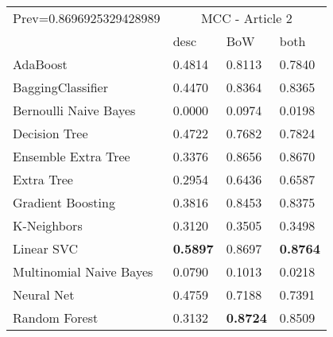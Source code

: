\begin{tabular}{|l|l|l|l| }
\hline
Prev=0.8696925329428989 &  \multicolumn{3}{c|}{MCC - Article 2} \\
\cline{2-4} & desc & BoW & both \\ \hline
AdaBoost                & 0.4814 & 0.8113 & 0.7840\\
BaggingClassifier       & 0.4470 & 0.8364 & 0.8365\\
Bernoulli Naive Bayes   & 0.0000 & 0.0974 & 0.0198\\
Decision Tree           & 0.4722 & 0.7682 & 0.7824\\
Ensemble Extra Tree     & 0.3376 & 0.8656 & 0.8670\\
Extra Tree              & 0.2954 & 0.6436 & 0.6587\\
Gradient Boosting       & 0.3816 & 0.8453 & 0.8375\\
K-Neighbors             & 0.3120 & 0.3505 & 0.3498\\
Linear SVC              & {\bf 0.5897} & 0.8697 & {\bf 0.8764}\\
Multinomial Naive Bayes & 0.0790 & 0.1013 & 0.0218\\
Neural Net              & 0.4759 & 0.7188 & 0.7391\\
Random Forest           & 0.3132 & {\bf 0.8724} & 0.8509\\
\hline
\end{tabular}